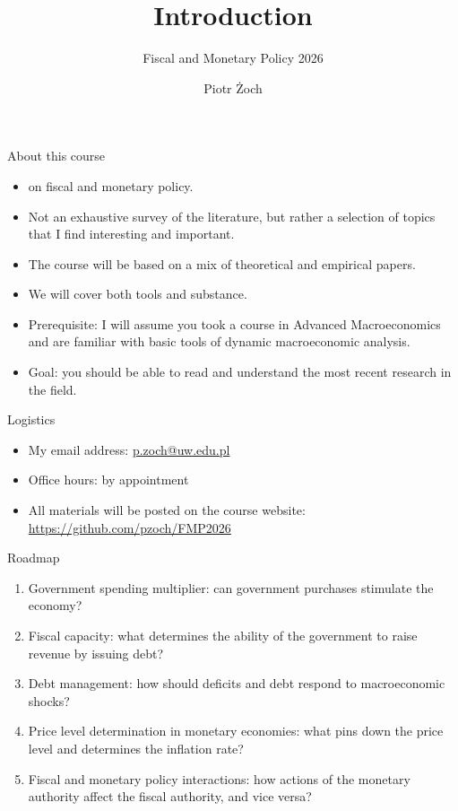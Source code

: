 \documentclass[11pt,xcolor={dvipsnames},aspectratio=159,hyperref={pdftex,pdfpagemode=UseNone,hidelinks,pdfdisplaydoctitle=true},usepdftitle=false]{beamer}
\begin{document}
\title{Introduction}
\subtitle{Fiscal and Monetary Policy 2026}

\author{Piotr Żoch}%
\frame{\titlepage}



\begin{frame}{About this course}
    \begin{itemize}
    \item {} on fiscal and monetary policy. 
    \item Not an exhaustive survey of the literature, but rather a selection of topics that I find interesting and important.
    \item The course will be based on a mix of theoretical and empirical papers.
    \item We will cover both tools and substance.
    \item Prerequisite: I will assume you took a course in Advanced Macroeconomics and are familiar with basic tools of dynamic macroeconomic analysis.
    \item Goal: you should be able to read and understand the most recent research in the field. 
    \end{itemize}
\end{frame}

\begin{frame}{Logistics}
    \begin{itemize}
    \item My email address: \url{p.zoch@uw.edu.pl}
    \item Office hours: by appointment
    \item All materials will be posted on the course website: \url{https://github.com/pzoch/FMP2026}
    \end{itemize}
\end{frame}


\begin{frame}{Roadmap}
    \begin{enumerate}
    \item Government spending multiplier: can government purchases stimulate the economy? 
    \item Fiscal capacity: what determines the ability of the government to raise revenue by issuing debt?
    \item Debt management: how should deficits and debt respond to macroeconomic shocks?
    \item Price level determination in monetary economies: what pins down the price level and determines the inflation rate?
    \item Fiscal and monetary policy interactions: how actions of the monetary authority affect the fiscal authority, and vice versa?
    \end{enumerate}
\end{frame}
\end{document}
